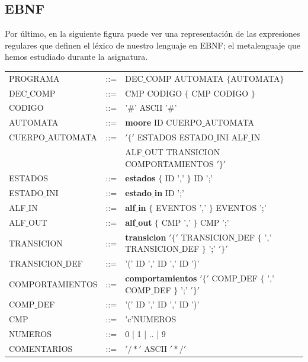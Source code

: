 \documentclass[12pt,a4paper]{article}
\begin{document}
\subsection{EBNF}
Por último, en la siguiente figura puede ver una representación de las expresiones regulares que definen el léxico de nuestro lenguaje en EBNF; el metalenguaje que hemos estudiado durante la asignatura.

			\begin{center}
			\begin{tabular}{lcl}
	

				PROGRAMA & ::= & DEC$\_$COMP AUTOMATA $\{$AUTOMATA$\}$ \\ 
				 
				
				DEC$\_$COMP & ::= &CMP  CODIGO $\{$ CMP CODIGO $\}$ \\ 
			
				CODIGO 	&::= &'$\#$' ASCII '$\#$' \\ 
				
				AUTOMATA & ::= & \textbf{moore} ID CUERPO$\_$AUTOMATA \\
				
			
				CUERPO$\_$AUTOMATA	& ::= & $'\{'$ ESTADOS ESTADO$\_$INI ALF$\_$IN  \\ 
				
					& &  ALF$\_$OUT TRANSICION COMPORTAMIENTOS $'\}'$ \\ 
				
				ESTADOS	& ::= &   \textbf{estados} $\{$ ID ',' $\}$ ID ';'\\ 
				
				 ESTADO$\_$INI &::= & \textbf{estado$\_$in} ID ';'\\ 
				 
				ALF$\_$IN &::= & \textbf{alf$\_$in}  $\{$ EVENTOS ',' $\}$ EVENTOS ';' \\ 
				
				ALF$\_$OUT & ::= &\textbf{alf$\_$out}  $\{$ CMP ',' $\}$ CMP ';'  \\ 
				
				TRANSICION 	 & ::= & \textbf{transicion} $'\{'$ TRANSICION$\_$DEF $\{$ ',' TRANSICION$\_$DEF  $\}$ ';' $'\}'$ \\ 
				
				TRANSICION$\_$DEF & ::= & '(' ID ',' ID ',' ID ')' \\ 
			
				
				COMPORTAMIENTOS	 & ::= &  \textbf{comportamientos} $'\{'$ COMP$\_$DEF $\{$ ',' COMP$\_$DEF $\}$ ';' $'\}'$\\ 
				
				COMP$\_$DEF &  ::= & '(' ID ',' ID ',' ID ')' \\ 
				
				
				CMP  & ::= & 'c'NUMEROS \\ 
				
				NUMEROS &::= & 0 | 1 | .. | 9 \\ 
				
				COMENTARIOS & ::=  & $'/\ast'$ ASCII $'\ast/'$ \\
				
				
			\end{tabular} 	
		\end{center}
	
\end{document}
